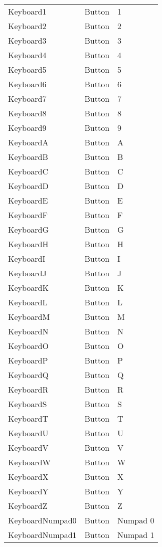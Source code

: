 \begin{center}
\begin{longtable}{ | l | l | p{9cm} |}
	Keyboard1					&	Button	&	1\\
	Keyboard2					&	Button	&	2\\
	Keyboard3					&	Button	&	3\\
	Keyboard4					&	Button	&	4\\
	Keyboard5					&	Button	&	5\\
	Keyboard6					&	Button	&	6\\
	Keyboard7					&	Button	&	7\\
	Keyboard8					&	Button	&	8\\
	Keyboard9					&	Button	&	9\\
	KeyboardA					&	Button	&	A\\
	KeyboardB					&	Button	&	B\\
	KeyboardC					&	Button	&	C\\
	KeyboardD					&	Button	&	D\\
	KeyboardE					&	Button	&	E\\
	KeyboardF					&	Button	&	F\\
	KeyboardG					&	Button	&	G\\
	KeyboardH					&	Button	&	H\\
	KeyboardI					&	Button	&	I\\
	KeyboardJ					&	Button	&	J\\
	KeyboardK					&	Button	&	K\\
	KeyboardL					&	Button	&	L\\
	KeyboardM					&	Button	&	M\\
	KeyboardN					&	Button	&	N\\
	KeyboardO					&	Button	&	O\\
	KeyboardP					&	Button	&	P\\
	KeyboardQ					&	Button	&	Q\\
	KeyboardR					&	Button	&	R\\
	KeyboardS					&	Button	&	S\\
	KeyboardT					&	Button	&	T\\
	KeyboardU					&	Button	&	U\\
	KeyboardV					&	Button	&	V\\
	KeyboardW					&	Button	&	W\\
	KeyboardX					&	Button	&	X\\
	KeyboardY					&	Button	&	Y\\
	KeyboardZ					&	Button	&	Z\\
	KeyboardNumpad0				&	Button	&	Numpad 0\\
	KeyboardNumpad1				&	Button	&	Numpad 1\\

\end{longtable}
\end{center}
